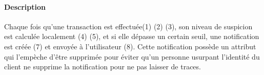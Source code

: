 \paragraph{Description} Chaque fois qu'une transaction est effectuée(1) (2) (3), son niveau de suspicion est calculée localement (4) (5), et si elle dépasse un certain seuil, une notification est créée (7) et envoyée à l'utilisateur (8). Cette notification possède un attribut qui l'empèche d'être supprimée pour éviter qu'un personne usurpant l'identité du client ne supprime la notification pour ne pas laisser de traces.